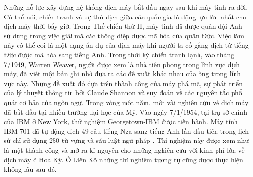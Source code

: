 Những nỗ lực xây dựng hệ thống dịch máy bắt đầu ngay sau khi máy tính ra đời. Có thể nói, chiến tranh và sự thù địch giữa các quốc gia là động lực lớn nhất cho dịch máy thời bấy giờ. Trong Thế chiến thứ II, máy tính đã được quân đội Anh sử dụng trong việc giải mã các thông điệp được mã hóa của quân Đức. Việc làm này có thể coi là một dạng ẩn dụ của dịch máy khi người ta cố gắng dịch từ tiếng Đức được mã hóa sang tiếng Anh. Trong thời kỳ chiến tranh lạnh, vào tháng 7/1949, Warren Weaver, người được xem là nhà tiên phong trong lĩnh vực dịch máy, đã viết một bản ghi nhớ đưa ra các đề xuất khác nhau của ông trong lĩnh vực này. Những đề xuất đó dựa trên thành công của máy phá mã, sự phát triển của lý thuyết thông tin bởi Claude Shannon và suy đoán về các nguyên tắc phổ quát cơ bản của ngôn ngữ. Trong vòng một năm, một vài nghiên cứu về dịch máy đã bắt đầu tại nhiều trường đại học của Mỹ. Vào ngày 7/1/1954, tại trụ sở chính của IBM ở New York, thử nghiệm Georgetown-IBM được tiến hành. Máy tính IBM 701 đã tự động dịch 49 câu tiếng Nga sang tiếng Anh lần đầu tiên trong lịch sử chỉ sử dụng 250 từ vựng và sáu luật ngữ pháp \cite{hutchins}. Thí nghiệm này được xem như là một thành công và mở ra kỉ nguyên cho những nghiên cứu với kinh phí lớn về dịch máy ở Hoa Kỳ. Ở Liên Xô những thí nghiệm tương tự cũng được thực hiện không lâu sau đó.


